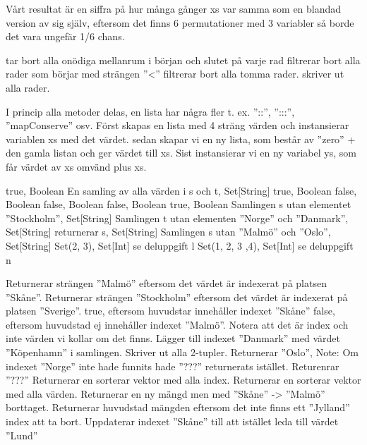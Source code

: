Vårt resultat är en siffra på hur många gånger xs var samma som en blandad version av sig själv, eftersom det finns 6 permutationer med 3 variabler så borde det vara ungefär 1/6 chans.

\Subtask 
{} tar bort alla onödiga mellanrum i början och slutet på varje rad
 filtrerar bort alla rader som börjar med strängen ''<''
 filtrerar bort alla tomma rader.
 skriver ut alla rader.

\Task %
\Subtask 
I princip alla metoder delas, en lista har några fler t. ex. ''::'', '':::'', ''mapConserve'' osv.
\Subtask 
Först skapas en lista med 4 sträng värden och instansierar variablen xs med det värdet.
sedan skapar vi en ny lista, som består av ''zero'' + den gamla listan och ger värdet till xs.
Sist instansierar vi en ny variabel ys, som får värdet av xs omvänd plus xs.

\Task %
\Subtask 
true, Boolean
\Subtask 
En samling av alla värden i s och t, Set[String]
\Subtask 
true, Boolean
\Subtask 
false, Boolean
\Subtask 
false, Boolean
\Subtask 
false, Boolean
\Subtask 
true, Boolean
\Subtask 
Samlingen s utan elementet ''Stockholm'', Set[String]
\Subtask 
Samlingen t utan elementen ''Norge'' och ''Danmark'', Set[String]
\Subtask 
returnerar s, Set[String]
\Subtask 
Samlingen s utan ''Malmö'' och ''Oslo'', Set[String]
\Subtask 
Set(2, 3), Set[Int]
\Subtask 
se deluppgift l
\Subtask 
Set(1, 2, 3 ,4), Set[Int]
\Subtask 
se deluppgift n

\Task %
\Subtask 
Returnerar strängen ''Malmö'' eftersom det värdet är indexerat på platsen ''Skåne''.
\Subtask 
Returnerar strängen ''Stockholm'' eftersom det värdet är indexerat på platsen ''Sverige''.
\Subtask 
true, eftersom huvudstar innehåller indexet ''Skåne''
\Subtask 
false, eftersom huvudstad ej innehåller indexet ''Malmö''. Notera att det är index och inte värden vi kollar om det finns.
\Subtask 
Lägger till indexet ''Danmark'' med värdet ''Köpenhamn'' i samlingen.
\Subtask 
Skriver ut alla 2-tupler.
\Subtask 
Returnerar ''Oslo'', Note: Om indexet ''Norge'' inte hade funnits hade ''???'' returnerats istället.
\Subtask 
Returenrar ''???''
\Subtask 
Returnerar en sorterar vektor med alla index.
\Subtask 
Returnerar en sorterar vektor med alla värden.
\Subtask 
Returnerar en ny mängd men med ''Skåne'' -> ''Malmö'' borttaget. 
\Subtask 
Returnerar huvudstad mängden eftersom det inte finns ett ''Jylland'' index att ta bort.
\Subtask 
Uppdaterar indexet ''Skåne'' till att istället leda till värdet ''Lund''

